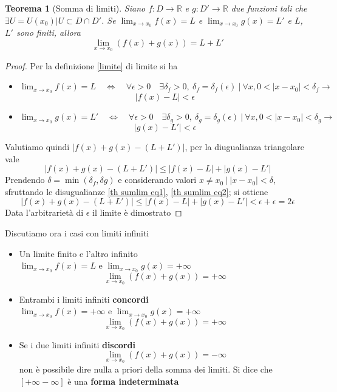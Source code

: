 \documentclass[]{report}
\theoremstyle{definition}
\theoremstyle{remark}
\theoremstyle{plain}
\newtheorem{theor}{Teorema}[chapter]
\numberwithin{equation}{chapter}
\begin{document}
\begin{theor}[Somma di limiti]\label{th sumlim}
	Siano $f:D \to \mathbb{R}$ e $g:D' \to \mathbb{R}$ due funzioni tali che $\exists U=U(x_{0}) | U \subset D \cap D'$. Se $\lim_{x \to x_{0}}f(x)=L$ e $\lim_{x \to x_{0}}g(x)=L'$ e $L$,$L'$ sono finiti, allora
	$$\lim_{x \to x_{0}}(f(x)+g(x))=L+L'$$
\end{theor}
\begin{proof}
	Per la definizione \ref{limite} di limite si ha
	\begin{itemize}
		\item $\lim_{x\to x_{0}} f(x)=L \quad \Leftrightarrow \quad \forall \epsilon > 0 \quad \exists \delta_{f} > 0 ,\ \delta_{f} = \delta_{f} (\epsilon ) \ | \ \forall x, 0<|x-x_{0}|<\delta_{f} \rightarrow$
		\begin{equation}\label{th sumlim eq1}
			|f(x)-L|<\epsilon
		\end{equation}
		\item $\lim_{x\to x_{0}} g(x)=L' \quad \Leftrightarrow \quad \forall \epsilon > 0 \quad \exists \delta_{g} > 0 ,\ \delta_{g} = \delta_{g} (\epsilon ) \ | \ \forall x, 0<|x-x_{0}|<\delta_{g} \rightarrow$
		\begin{equation}\label{th sumlim eq2}
			|g(x)-L'|<\epsilon
		\end{equation}
	\end{itemize}
	Valutiamo quindi $|f(x)+g(x)-(L+L')|$, per la diugualianza triangolare vale
	$$|f(x)+g(x)-(L+L')| \leq |f(x)-L|+|g(x)-L'|$$
	Prendendo $\delta=\min(\delta_{f},\delta{g})$ e considerando valori $x \neq x_{0} \ | \ |x-x_{0}|<\delta$, sfruttando le disugualianze \eqref{th sumlim eq1}, \eqref{th sumlim eq2}; si ottiene
	$$|f(x)+g(x)-(L+L')| \leq |f(x)-L|+|g(x)-L'| < \epsilon + \epsilon = 2\epsilon$$
	Data l'arbitrariet\`{a} di $\epsilon$ il limite \`{e} dimostrato
\end{proof}

Discutiamo ora i casi con limiti infiniti
\begin{itemize}
	\item Un limite finito e l'altro infinito
\\	$\lim_{x\to x_{0}} f(x)=L$ e $\lim_{x\to x_{0}} g(x)=+\infty$
	$$\lim_{x \to x_{0}}(f(x)+g(x))=+\infty$$
	\item Entrambi i limiti infiniti \textbf{concordi}
\\	$\lim_{x\to x_{0}} f(x)=+\infty$ e $\lim_{x\to x_{0}} g(x)=+\infty$
	$$\lim_{x \to x_{0}}(f(x)+g(x))=+\infty$$
	\item Se i due limiti infiniti \textbf{discordi} 
	$$\lim_{x \to x_{0}}(f(x)+g(x))=-\infty$$
	non \`{e} possibile dire nulla a priori della somma dei limiti. Si dice che $[+\infty-\infty]$ \`{e} una \textbf{forma indeterminata}
\end{itemize}
\end{document}
